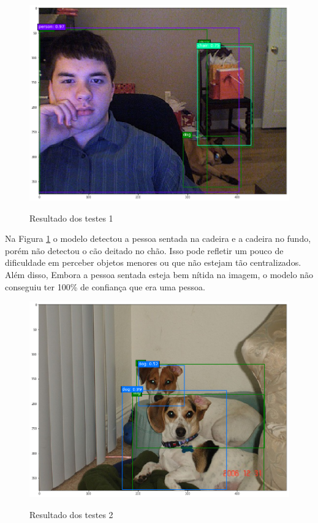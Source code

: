 \begin{figure}[H]
	\setlength{\abovecaptionskip}{0pt}
	\setlength{\belowcaptionskip}{0pt}
	\caption[Resultado dos testes 1]{Resultado dos testes 1}
	\centering
	\includegraphics[width=.6\textwidth]{imagem/test_image_5.png}
	\captionsetup{justification=centering}
	\label{fig:teste_1}
\end{figure}

Na Figura \ref{fig:teste_1} o modelo detectou a pessoa sentada na cadeira e a cadeira no fundo, porém não detectou o cão deitado no chão. Isso pode refletir um pouco de dificuldade em perceber objetos menores ou que não estejam tão centralizados. Além disso, Embora a pessoa sentada esteja bem nítida na imagem, o modelo não conseguiu ter 100\% de confiança que era uma pessoa.

\begin{figure}[H]
	\setlength{\abovecaptionskip}{0pt}
	\setlength{\belowcaptionskip}{0pt}
	\caption[Resultado dos testes 2]{Resultado dos testes 2}
	\centering
	\includegraphics[width=.6\textwidth]{imagem/test_image_3.png}
	\captionsetup{justification=centering}
	\label{fig:teste_2}
\end{figure}


